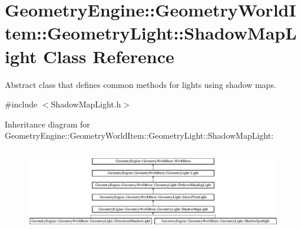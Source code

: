 \hypertarget{class_geometry_engine_1_1_geometry_world_item_1_1_geometry_light_1_1_shadow_map_light}{}\section{Geometry\+Engine\+::Geometry\+World\+Item\+::Geometry\+Light\+::Shadow\+Map\+Light Class Reference}
\label{class_geometry_engine_1_1_geometry_world_item_1_1_geometry_light_1_1_shadow_map_light}


Abstract class that defines common methods for lights using shadow maps.  




{\ttfamily \#include $<$Shadow\+Map\+Light.\+h$>$}

Inheritance diagram for Geometry\+Engine\+::Geometry\+World\+Item\+::Geometry\+Light\+::Shadow\+Map\+Light\+:\begin{figure}[H]
\begin{center}
\leavevmode
\includegraphics[height=3.700440cm]{class_geometry_engine_1_1_geometry_world_item_1_1_geometry_light_1_1_shadow_map_light}
\end{center}
\end{figure}
